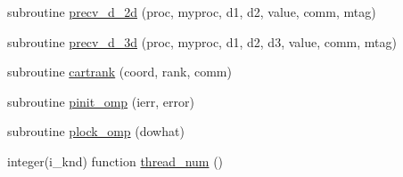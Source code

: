 \begin{DoxyCompactItemize}
\item 
subroutine \hyperlink{classplib__module_ac4722c07063b81f7b260132f16f5b17f}{precv\-\_\-d\-\_\-2d} (proc, myproc, d1, d2, value, comm, mtag)
\item 
subroutine \hyperlink{classplib__module_a4bb9d60a8dee39c7d1df606cb1ec48d1}{precv\-\_\-d\-\_\-3d} (proc, myproc, d1, d2, d3, value, comm, mtag)
\item 
subroutine \hyperlink{classplib__module_a31e3a1f18b78ea21eb4b76edcfc5352b}{cartrank} (coord, rank, comm)
\item 
subroutine \hyperlink{classplib__module_a5ad7e8ca3705ac070d1c9f1e63632153}{pinit\-\_\-omp} (ierr, error)
\item 
subroutine \hyperlink{classplib__module_af6742553d9df98f688231b8cd62cf190}{plock\-\_\-omp} (dowhat)
\item 
integer(i\-\_\-knd) function \hyperlink{classplib__module_a3b20a8eb56e03976578f415bf06ad72e}{thread\-\_\-num} ()
\end{DoxyCompactItemize}
